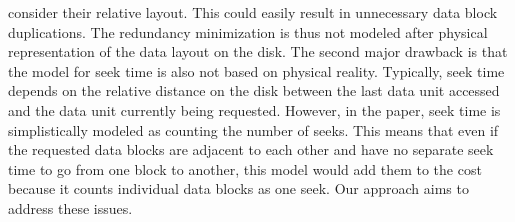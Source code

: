 consider their relative layout. This could easily result in unnecessary data
block duplications. The redundancy minimization is thus not modeled after
physical representation of the data layout on the disk. The second major
drawback is that the model for seek time is also not based on physical reality.
Typically, seek time depends on the relative distance on the disk between the
last data unit accessed and the data unit currently being requested. However,
in the paper, seek time is simplistically modeled as counting the number of
seeks. This means
that even if the requested data blocks are adjacent to each other and have no
separate seek time to go from one block to another, this model would add them
to the cost because it counts individual data blocks as one seek. Our approach
aims to address these issues. 

